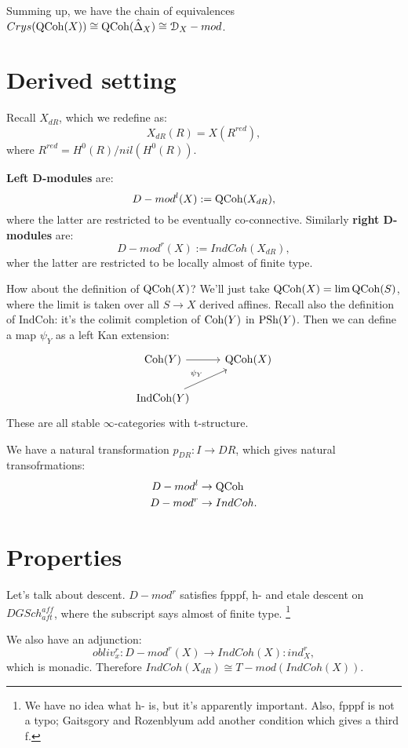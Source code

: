 Summing up, we have the chain of equivalences $Crys(\mathrm{QCoh}(X)) \cong \mathrm{QCoh}(\hat \Delta_X) \cong \mathcal{D}_X - mod$.


\section{Derived setting}
Recall $X_{dR}$, which we redefine as:
\[	X_{dR}(R) = X(R^{red}),	\]
where $R^{red} = H^0(R) / nil(H^0(R))$.

\begin{defin}
\textbf{Left D-modules} are:
\[	D-mod^l (X) := \mathrm{QCoh}(X_{dR}),	\]
where the latter are restricted to be eventually co-connective. Similarly \textbf{right D-modules} are:
\[	D-mod^r (X) := IndCoh(X_{dR}),	\]
wher the latter are restricted to be locally almost of finite type.
\end{defin}

How about the definition of $\mathrm{QCoh}(X)$? We'll just take $\mathrm{QCoh}(X) = \lim \mathrm{QCoh}(S)$, where the limit is taken over all
$S \to X$ derived affines. Recall also the definition of IndCoh: it's the colimit completion of $\mathrm{Coh}(Y)$ in
$\mathrm{PSh}(Y)$. Then we can define a map $\psi_Y$ as a left Kan extension:
\[
\begin{tikzcd}
\Coh(Y) \arrow{r} & \QCoh(X) \\
\IndCoh(Y) \arrow{ur}{\psi_Y} &
\end{tikzcd}
\]
These are all stable $\infty$-categories with t-structure. 

We have a natural transformation $p_{DR} : I \to DR$, which gives natural transofrmations:
\begin{align*}
D-mod^l &\to \mathrm{QCoh} \\
D-mod^r &\to IndCoh.
\end{align*}



\section{Properties}

Let's talk about descent. $D-mod^r$ satisfies fpppf, h- and etale descent on $DGSch_{aft}^{aff}$, where the subscript says
almost of finite type. \footnote{We have no idea what h- is, but it's apparently important. Also, fpppf is not a typo;
Gaitsgory and Rozenblyum add another condition which gives a third f.}

We also have an adjunction:
\[	obliv_x^r : D-mod^r(X) \to IndCoh(X) : ind_X^r,	\]
which is monadic. Therefore $IndCoh(X_{dR}) \cong T-mod (IndCoh(X))$.

